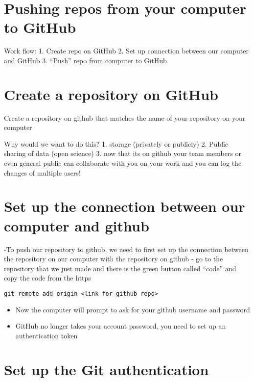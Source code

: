 \documentclass[]{article}
\providecommand{\tightlist}{%
  \setlength{\itemsep}{0pt}\setlength{\parskip}{0pt}}
\begin{document}
\section{Pushing repos from your computer to
GitHub}\label{pushing-repos-from-your-computer-to-github}

Work flow: 1. Create repo on GitHub 2. Set up connection between our
computer and GitHub 3. ``Push'' repo from computer to GitHub

\section{Create a repository on
GitHub}\label{create-a-repository-on-github}

Create a repository on github that matches the name of your repository
on your computer

Why would we want to do this? 1. storage (privately or publicly) 2.
Public sharing of data (open science) 3. now that its on github your
team members or even general public can collaborate with you on your
work and you can log the changes of multiple users!

\section{Set up the connection between our computer and
github}\label{set-up-the-connection-between-our-computer-and-github}

-To push our repository to github, we need to first set up the
connection between the repository on our computer with the repository on
github - go to the repository that we just made and there is the green
button called ``code'' and copy the code from the https

\texttt{git\ remote\ add\ origin\ \textless{}link\ for\ github\ repo\textgreater{}}

\begin{itemize}
\tightlist
\item
  Now the computer will prompt to ask for your github username and
  password
\item
  GitHub no longer takes your account password, you need to set up an
  authentication token
\end{itemize}

\section{Set up the Git
authentication}\label{set-up-the-git-authentication}
\end{document}
